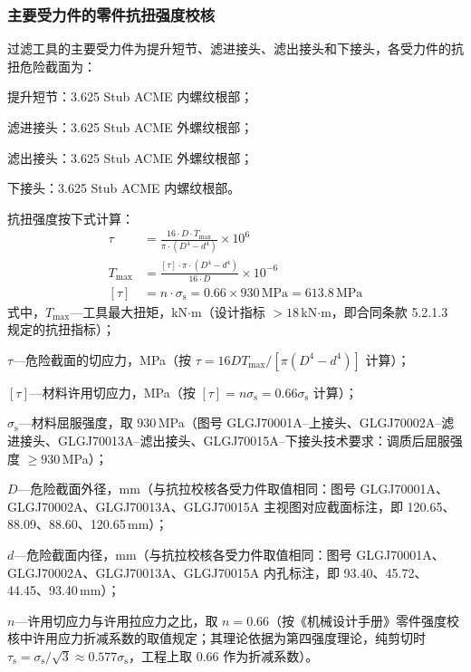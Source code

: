 \subsubsection{主要受力件的零件抗扭强度校核}

过滤工具的主要受力件为提升短节、滤进接头、滤出接头和下接头，各受力件的抗扭危险截面为：

提升短节：3.625 Stub ACME 内螺纹根部；

滤进接头：3.625 Stub ACME 外螺纹根部；

滤出接头：3.625 Stub ACME 外螺纹根部；

下接头：3.625 Stub ACME 内螺纹根部。

抗扭强度按下式计算：
\begin{equation}
    \begin{aligned}
        \tau &= \frac{16 \cdot D \cdot T_{\max}}{\pi \cdot (D^4 - d^4)} \times 10^{6} \\
        T_{\max} &= \frac{[\tau] \cdot \pi \cdot (D^4 - d^4)}{16 \cdot D} \times 10^{-6} \\
        [\tau] &= n \cdot \sigma_{\mathrm{s}} = 0.66 \times 930\,\text{MPa} = 613.8\,\text{MPa}
    \end{aligned}
\end{equation}
式中，$T_{\max}$---工具最大扭矩，kN$\cdot$m（设计指标 $>18$\,kN$\cdot$m，即合同条款 5.2.1.3 规定的抗扭指标）；

$\tau$---危险截面的切应力，MPa（按 $\tau = 16DT_{\max}/[\pi(D^4-d^4)]$ 计算）；

$[\tau]$---材料许用切应力，MPa（按 $[\tau]=n\sigma_{\mathrm{s}} = 0.66\sigma_{\mathrm{s}}$ 计算）；

$\sigma_{\mathrm{s}}$---材料屈服强度，取 930\,MPa（图号 GLGJ70001A--上接头、GLGJ70002A--滤进接头、GLGJ70013A--滤出接头、GLGJ70015A--下接头技术要求：调质后屈服强度 $\ge 930$\,MPa）；

$D$---危险截面外径，mm（与抗拉校核各受力件取值相同：图号 GLGJ70001A、GLGJ70002A、GLGJ70013A、GLGJ70015A 主视图对应截面标注，即 120.65、88.09、88.60、120.65\,mm）；

$d$---危险截面内径，mm（与抗拉校核各受力件取值相同：图号 GLGJ70001A、GLGJ70002A、GLGJ70013A、GLGJ70015A 内孔标注，即 93.40、45.72、44.45、93.40\,mm）；

$n$---许用切应力与许用拉应力之比，取 $n=0.66$（按《机械设计手册》零件强度校核中许用应力折减系数的取值规定\cite{ref26}；其理论依据为第四强度理论，纯剪切时 $\tau_{\mathrm{s}} = \sigma_{\mathrm{s}}/\sqrt{3} \approx 0.577\sigma_{\mathrm{s}}$，工程上取 $0.66$ 作为折减系数）。

